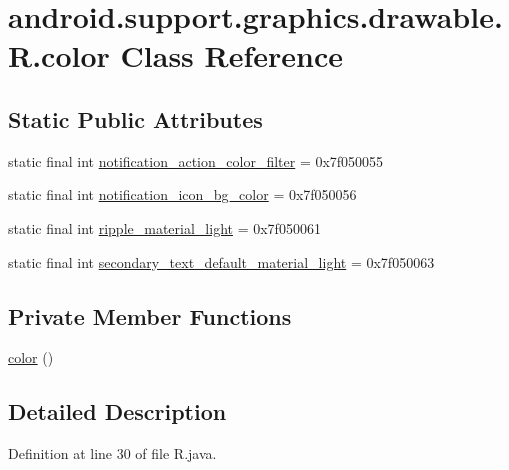 \hypertarget{classandroid_1_1support_1_1graphics_1_1drawable_1_1_r_1_1color}{}\section{android.\+support.\+graphics.\+drawable.\+R.\+color Class Reference}
\label{classandroid_1_1support_1_1graphics_1_1drawable_1_1_r_1_1color}
\subsection*{Static Public Attributes}
\begin{DoxyCompactItemize}
\item 
static final int \mbox{\hyperlink{classandroid_1_1support_1_1graphics_1_1drawable_1_1_r_1_1color_a070312edeee48cdc7fe68bb6089c2044}{notification\+\_\+action\+\_\+color\+\_\+filter}} = 0x7f050055
\item 
static final int \mbox{\hyperlink{classandroid_1_1support_1_1graphics_1_1drawable_1_1_r_1_1color_a1f9831c20e945d5290845da00d6edf8e}{notification\+\_\+icon\+\_\+bg\+\_\+color}} = 0x7f050056
\item 
static final int \mbox{\hyperlink{classandroid_1_1support_1_1graphics_1_1drawable_1_1_r_1_1color_a508f091a5bc2b16ac3301a7bb4eaa6e8}{ripple\+\_\+material\+\_\+light}} = 0x7f050061
\item 
static final int \mbox{\hyperlink{classandroid_1_1support_1_1graphics_1_1drawable_1_1_r_1_1color_a80596cd1d42bebf6c55a976d7ab49ee2}{secondary\+\_\+text\+\_\+default\+\_\+material\+\_\+light}} = 0x7f050063
\end{DoxyCompactItemize}
\subsection*{Private Member Functions}
\begin{DoxyCompactItemize}
\item 
\mbox{\hyperlink{classandroid_1_1support_1_1graphics_1_1drawable_1_1_r_1_1color_a5032413a343a6521e02e2982663e6b94}{color}} ()
\end{DoxyCompactItemize}


\subsection{Detailed Description}


Definition at line 30 of file R.\+java.



